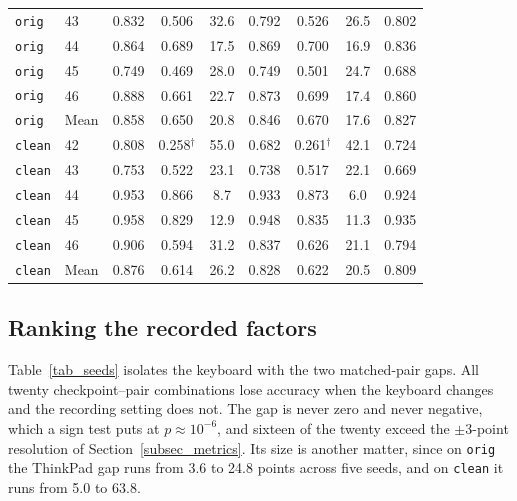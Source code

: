 \documentclass[pdflatex,sn-mathphys-num,iicol]{sn-jnl}
\begin{document}
\begin{table}[t]
\begin{tabular*}{\textwidth}{@{\extracolsep{\fill}}llccccccc@{}}
\texttt{orig} & 43 & 0.832 & 0.506 & 32.6 & 0.792 & 0.526 & 26.5 & 0.802 \\
\texttt{orig} & 44 & 0.864 & 0.689 & 17.5 & 0.869 & 0.700 & 16.9 & 0.836 \\
\texttt{orig} & 45 & 0.749 & 0.469 & 28.0 & 0.749 & 0.501 & 24.7 & 0.688 \\
\texttt{orig} & 46 & 0.888 & 0.661 & 22.7 & 0.873 & 0.699 & 17.4 & 0.860 \\
\texttt{orig} & Mean & 0.858 & 0.650 & 20.8 & 0.846 & 0.670 & 17.6 & 0.827 \\
\texttt{clean} & 42 & 0.808 & 0.258$^\dagger$ & 55.0 & 0.682 & 0.261$^\dagger$ & 42.1 & 0.724 \\
\texttt{clean} & 43 & 0.753 & 0.522 & 23.1 & 0.738 & 0.517 & 22.1 & 0.669 \\
\texttt{clean} & 44 & 0.953 & 0.866 & 8.7 & 0.933 & 0.873 & 6.0 & 0.924 \\
\texttt{clean} & 45 & 0.958 & 0.829 & 12.9 & 0.948 & 0.835 & 11.3 & 0.935 \\
\texttt{clean} & 46 & 0.906 & 0.594 & 31.2 & 0.837 & 0.626 & 21.1 & 0.794 \\
\texttt{clean} & Mean & 0.876 & 0.614 & 26.2 & 0.828 & 0.622 & 20.5 & 0.809 \\
\bottomrule
\end{tabular*}
\end{table}

\subsection{Ranking the recorded factors}\label{subsec_res_factors}

Table~\ref{tab_seeds} isolates the keyboard with the two matched-pair gaps. All twenty checkpoint--pair combinations lose accuracy when the keyboard changes and the recording setting does not. The gap is never zero and never negative, which a sign test puts at $p\approx10^{-6}$, and sixteen of the twenty exceed the $\pm3$-point resolution of Section~\ref{subsec_metrics}. Its size is another matter, since on \texttt{orig} the ThinkPad gap runs from 3.6 to 24.8 points across five seeds, and on \texttt{clean} it runs from 5.0 to 63.8.
\end{document}
